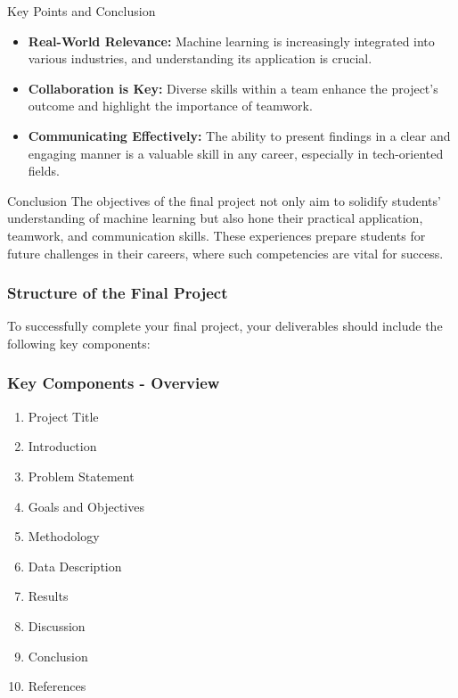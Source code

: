 \documentclass[aspectratio=169]{beamer}
\begin{document}
\begin{frame}[fragile]{Key Points and Conclusion}
    \begin{itemize}
        \item \textbf{Real-World Relevance:} Machine learning is increasingly integrated into various industries, and understanding its application is crucial.
        \item \textbf{Collaboration is Key:} Diverse skills within a team enhance the project’s outcome and highlight the importance of teamwork.
        \item \textbf{Communicating Effectively:} The ability to present findings in a clear and engaging manner is a valuable skill in any career, especially in tech-oriented fields.
    \end{itemize}

    \begin{block}{Conclusion}
        The objectives of the final project not only aim to solidify students' understanding of machine learning but also hone their practical application, teamwork, and communication skills. 
        These experiences prepare students for future challenges in their careers, where such competencies are vital for success.
    \end{block}
\end{frame}

\begin{frame}[fragile]
    \frametitle{Structure of the Final Project}
    To successfully complete your final project, your deliverables should include the following key components:
\end{frame}

\begin{frame}[fragile]
    \frametitle{Key Components - Overview}
    \begin{enumerate}
        \item Project Title
        \item Introduction
        \item Problem Statement
        \item Goals and Objectives
        \item Methodology
        \item Data Description
        \item Results
        \item Discussion
        \item Conclusion
        \item References
    \end{enumerate}
\end{frame}
\end{document}
